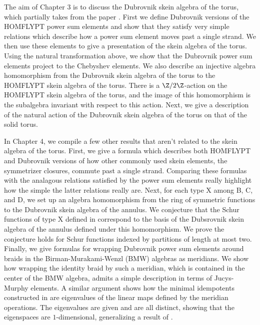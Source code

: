 The aim of Chapter 3 is to discuss the Dubrovnik skein algebra of the torus, which partially takes from the paper \cite{MPS20}. First we define Dubrovnik versions of the HOMFLYPT power sum elements and show that they satisfy very simple relations which describe how a power sum element moves past a single strand. We then use these elements to give a presentation of the skein algebra of the torus. Using the natural transformation above, we show that the Dubrovnik power sum elements project to the Chebyshev elements. We also describe an injective algebra homomorphism from the Dubrovnik skein algebra of the torus to the HOMFLYPT skein algebra of the torus. There is a $\Z/2\Z$-action on the HOMFLYPT skein algebra of the torus, and the image of this homomorphism is the subalgebra invariant with respect to this action. Next, we give a description of the natural action of the Dubrovnik skein algebra of the torus on that of the solid torus. 

In Chapter 4, we compile a few other results that aren't related to the skein algebra of the torus. First, we give a formula which describes both HOMFLYPT and Dubrovnik versions of how other commonly used skein elements, the symmetrizer closures, commute past a single strand. Comparing these formulas with the analagous relations satisfied by the power sum elements really highlight how the simple the latter relations really are. Next, for each type X among B, C, and D, we set up an algebra homomorphism from the ring of symmetric functions to the Dubrovnik skein algebra of the annulus. We conjecture that the Schur functions of type X defined in \cite{KT87} correspond to the basis of the Dubsrovnik skein algebra of the annulus defined \cite{LZ02} under this homomorphism. We prove the conjecture holds for Schur functions indexed by partitions of length at most two. Finally, we give formulas for wrapping Dubrovnik power sum elements around braids in the Birman-Murakami-Wenzl (BMW) algebras as meridians. We show how wrapping the identity braid by such a meridian, which is contained in the center of the BMW algebra, admits a simple description in terms of Jucys-Murphy elements. A similar argument shows how the minimal idempotents constructed in \cite{BB01} are eigenvalues of the linear maps defined by the meridian operations. The eigenvalues are given and are all distinct, showing that the eigenspaces are $1$-dimensional, generalizing a result of \cite{LZ02}.



















